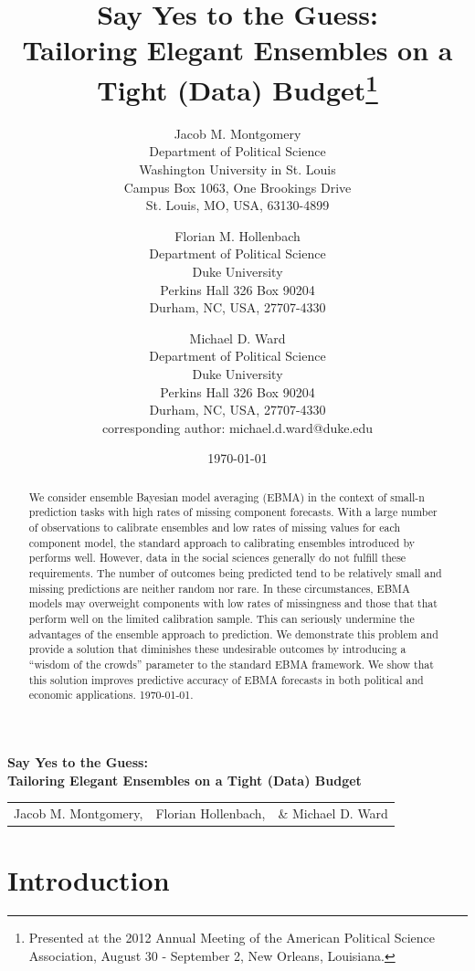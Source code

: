 \documentclass[12pt,fullpage,endnotes]{article}
\title{Say Yes to the Guess: \\ Tailoring Elegant Ensembles on a Tight
  (Data) Budget\thanks{Presented at the 2012 Annual Meeting of the American Political Science Association, August 30 - September 2, New Orleans, Louisiana. 
    }}
\author{
Jacob M. Montgomery\\
	Department of Political Science\\
	Washington University in St. Louis\\
	Campus Box 1063, One Brookings Drive\\
	St. Louis, MO, USA, 63130-4899 
	\and
Florian M. Hollenbach  \\
	Department of Political Science\\
	Duke University\\
	Perkins Hall 326 Box 90204\\
	Durham, NC, USA, 27707-4330
	\and
Michael D. Ward\\
	Department of Political Science\\
	Duke University\\
	Perkins Hall 326 Box 90204\\
	Durham, NC, USA, 27707-4330\\
	corresponding author: michael.d.ward@duke.edu
}
\date{\today}
\begin{document}
\maketitle
\thispagestyle{empty}
\clearpage
\pagestyle{myheadings}
\newpage
\singlespacing

\thispagestyle{empty}

{\centering \bf \large Say Yes to the Guess: \\ Tailoring Elegant Ensembles on a Tight (Data) Budget \\}

\begin{center}
\begin{tabular}{ccc}
Jacob M. Montgomery, & Florian Hollenbach, & \& Michael D. Ward\\
\end{tabular}
\end{center}

\begin{abstract}
  \noindent We consider ensemble Bayesian model averaging (EBMA) in
  the context of small-n prediction tasks with high rates of missing
  component forecasts.  With a large number of observations to
  calibrate ensembles and low rates of missing values for each
  component model, the standard approach to calibrating ensembles
  introduced by \cite{Raftery:2005} performs well. However, data in
  the social sciences generally do not fulfill these requirements. The
  number of outcomes being predicted tend to be relatively small and
  missing predictions are neither random nor rare. In these
  circumstances, EBMA models may overweight components with low rates
  of missingness and those that that perform well on the limited
  calibration sample.  This can seriously undermine the advantages of
  the ensemble approach to prediction.  We demonstrate this problem
  and provide a solution that diminishes these undesirable outcomes by
  introducing a ``wisdom of the crowds'' parameter to the standard
  EBMA framework. We show that this solution improves predictive
  accuracy of EBMA forecasts in both political and economic
  applications.  \today.
\end{abstract}



\setcounter{page}{1}

\section{Introduction}
\end{document}
